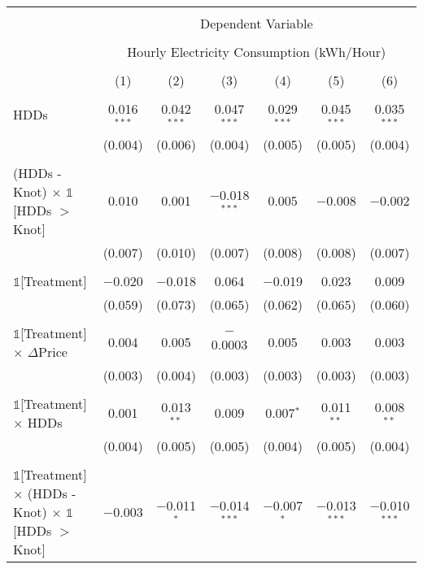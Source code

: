 
\begin{table}[!htbp] \centering 
  \label{Table:Breakdown-of-Average-Treatement-Effects_As-a-Function-of-Rate-Changes_For-Different-Intervals} 
\scriptsize
\begin{longtable}{@{\extracolsep{15pt}}lcccccc} 
\\[-1.8ex]\hline 
\hline \\[-1.8ex] 
 & \multicolumn{6}{c}{Dependent Variable} \\ 
\cline{2-7} 
\\[-1.8ex] & \multicolumn{6}{c}{Hourly Electricity Consumption  (kWh/Hour)} \\ 
\\[-1.8ex] & (1) & (2) & (3) & (4) & (5) & (6)\\ 
\hline \\[-1.8ex] \endhead
 HDDs & 0.016$^{***}$ & 0.042$^{***}$ & 0.047$^{***}$ & 0.029$^{***}$ & 0.045$^{***}$ & 0.035$^{***}$ \\ 
  & (0.004) & (0.006) & (0.004) & (0.005) & (0.005) & (0.004) \\ 
  & & & & & & \\ 
 (HDDs - Knot) $\times$ $\mathbb{1}$[HDDs $>$ Knot] & 0.010 & 0.001 & $-$0.018$^{***}$ & 0.005 & $-$0.008 & $-$0.002 \\ 
  & (0.007) & (0.010) & (0.007) & (0.008) & (0.008) & (0.007) \\ 
  & & & & & & \\ 
 $\mathbb{1}$[Treatment] & $-$0.020 & $-$0.018 & 0.064 & $-$0.019 & 0.023 & 0.009 \\ 
  & (0.059) & (0.073) & (0.065) & (0.062) & (0.065) & (0.060) \\ 
  & & & & & & \\ 
 $\mathbb{1}$[Treatment] $\times$ $\Delta$Price & 0.004 & 0.005 & $-$0.0003 & 0.005 & 0.003 & 0.003 \\ 
  & (0.003) & (0.004) & (0.003) & (0.003) & (0.003) & (0.003) \\ 
  & & & & & & \\ 
 $\mathbb{1}$[Treatment] $\times$ HDDs & 0.001 & 0.013$^{**}$ & 0.009 & 0.007$^{*}$ & 0.011$^{**}$ & 0.008$^{**}$ \\ 
  & (0.004) & (0.005) & (0.005) & (0.004) & (0.005) & (0.004) \\ 
  & & & & & & \\ 
 $\mathbb{1}$[Treatment] $\times$ (HDDs - Knot) $\times$ $\mathbb{1}$[HDDs $>$ Knot] & $-$0.003 & $-$0.011$^{*}$ & $-$0.014$^{***}$ & $-$0.007$^{*}$ & $-$0.013$^{***}$ & $-$0.010$^{***}$ \\ 

\end{longtable}
\end{table}

